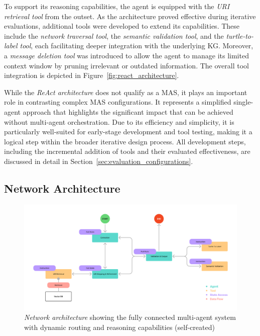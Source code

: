 \documentclass[a4paper,oneside,bibliography=totoc]{scrbook}
\begin{document}
To support its reasoning capabilities, the agent is equipped with the \textit{\ac{URI} retrieval tool} from the outset. As the architecture proved effective during iterative evaluations, additional tools were developed to extend its capabilities. These include the \textit{network traversal tool}, the \textit{semantic validation tool}, and the \textit{turtle-to-label tool}, each facilitating deeper integration with the underlying \ac{KG}. Moreover, a \textit{message deletion tool} was introduced to allow the agent to manage its limited context window by pruning irrelevant or outdated information. The overall tool integration is depicted in Figure~\ref{fig:react_architecture}.

While the \textit{\ac{ReAct} architecture} does not qualify as a \ac{MAS}, it plays an important role in contrasting complex \ac{MAS} configurations. It represents a simplified single-agent approach that highlights the significant impact that can be achieved without multi-agent orchestration. Due to its efficiency and simplicity, it is particularly well-suited for early-stage development and tool testing, making it a logical step within the broader iterative design process. All development steps, including the incremental addition of tools and their evaluated effectiveness, are discussed in detail in Section~\ref{sec:evaluation_configurations}.

\subsection{Network Architecture}
\label{subsec:network}

\begin{figure}[tp]
  \centering
  \includegraphics[width=\textwidth]{figures/Network Architecture.png}
  \caption[\textit{Network architecture} showing the fully connected multi-agent system with dynamic routing and reasoning capabilities]{\textit{Network architecture} showing the fully connected multi-agent system with dynamic routing and reasoning capabilities (self-created)}
  \label{fig:network_architecture}
\end{figure}
\end{document}
